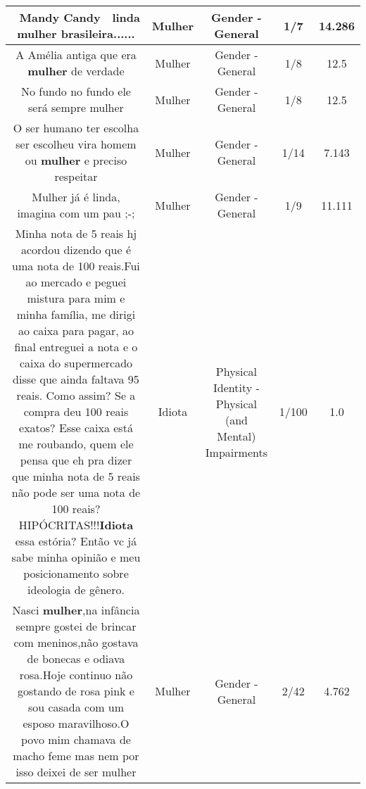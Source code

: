 \documentclass[11pt]{article}
\newlength\mylength
\begin{document}
\begin{center}
\begin{longtable}{|C{.65\mylength}|C{.30\mylength}|C{.12\mylength}|C{.12\mylength}|C{.12\mylength}|}
  \small 🍬 Mandy Candy 🍭  linda \textbf{mulher} brasileira......\normalsize   & Mulher & Gender - General & 1/7 & 14.286 \\  \hline
  \small A Amélia antiga que era \textbf{mulher} de verdade\normalsize   & Mulher & Gender - General & 1/8 & 12.5 \\  \hline
  \small No fundo no fundo ele será sempre mulher\normalsize   & Mulher & Gender - General & 1/8 & 12.5 \\  \hline
  \small O ser humano ter escolha ser escolheu vira homem ou \textbf{mulher}  e preciso respeitar\normalsize   & Mulher & Gender - General & 1/14 & 7.143 \\  \hline
  \small Mulher já é linda, imagina com um pau ;-;\normalsize   & Mulher & Gender - General & 1/9 & 11.111 \\  \hline
  \small Minha nota de 5 reais hj acordou dizendo que é uma nota de 100 reais.Fui ao mercado e peguei mistura para mim e minha família, me dirigi ao caixa para pagar, ao final entreguei a nota e o caixa do supermercado disse que ainda faltava 95 reais. Como assim? Se a compra deu 100 reais exatos? Esse caixa está me roubando, quem ele pensa que eh pra dizer que minha nota de 5 reais não pode ser uma nota de 100 reais? HIPÓCRITAS!!!\textbf{Idiota} essa estória? Então vc já sabe minha opinião e meu posicionamento sobre ideologia de gênero.\normalsize   & Idiota & Physical Identity - Physical (and Mental) Impairments & 1/100 & 1.0 \\  \hline
  \small Nasci \textbf{mulher},na infância sempre gostei de brincar com meninos,não gostava de bonecas e odiava rosa.Hoje continuo não gostando de rosa pink e sou casada com um esposo maravilhoso.O povo mim chamava de macho feme mas nem por isso deixei de ser mulher\normalsize   & Mulher & Gender - General & 2/42 & 4.762 \\  \hline

\end{longtable}
\end{center}
\end{document}
